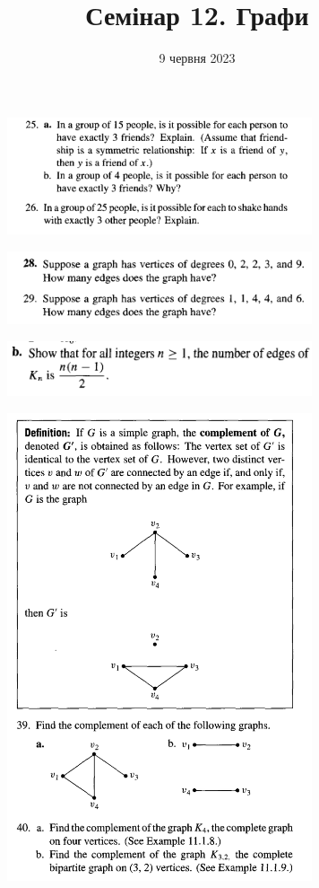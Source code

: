 \documentclass{article}
\begin{document}
\title{Семінар 12. Графи}
\date{9 червня 2023}

\maketitle

\begin{figure}[ht!]
\centering
\includegraphics[width=90mm]{1}
\end{figure}

\begin{figure}
\centering
\includegraphics[width=90mm]{2}
\end{figure}

\begin{figure}
\centering
\includegraphics[width=90mm]{3}
\end{figure}

\begin{figure}
\centering
\includegraphics[width=90mm]{4}
\end{figure}
\end{document}
